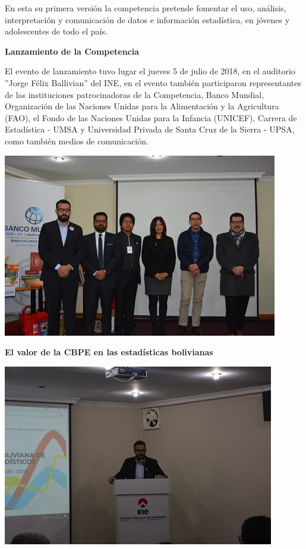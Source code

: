 \documentclass[8pt,a4paper]{article} %
\newcommand{\NewsItem}[1]{ %
\usefont{T1}{fvs}{n}{n} %
\vspace{24pt}\large #1\vspace{3pt} %
\par \normalsize \normalfont}
\begin{document}
\begin{multicols}{2}
 En esta su primera versión la competencia pretende fomentar el uso, análisis, interpretación y comunicación de datos e
 información estadística, en jóvenes y adolescentes de todo el país.

\NewsItem{\textbf{Lanzamiento de la Competencia}} 

\vspace{0.2cm}

El evento de lanzamiento tuvo lugar
 el jueves 5 de julio de 2018,  en el auditorio ''Jorge Félix Ballivian'' del INE, en el evento también participaron
 representantes de las instituciones patrocinadoras de la Competencia, Banco Mundial, Organización de las 
Naciones Unidas para la Alimentación y la Agricultura (FAO), el Fondo de las Naciones Unidas para la Infancia (UNICEF),
 Carrera de Estadística - UMSA y Universidad Privada de Santa Cruz de la Sierra - UPSA, como también medios de comunicación.

\begin{center}
\includegraphics[scale=0.6]{foto2.jpg} %
\end{center}

\NewsItem{\textbf{El valor de la  CBPE en las estadísticas bolivianas}}

\vspace{0.2cm}

\begin{center}
\includegraphics[scale=0.6]{foto3.jpg} %
\end{center}


\end{multicols}
\end{document}
